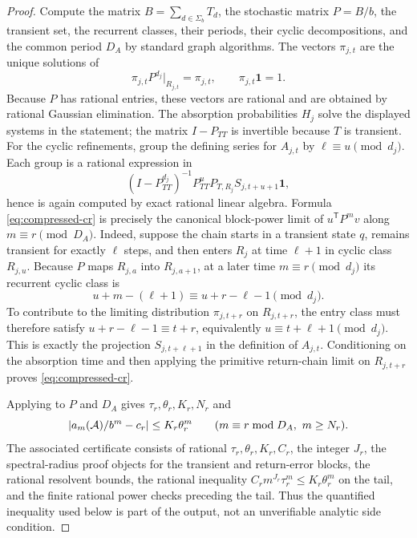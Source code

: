 \begin{proof}
  Compute the matrix \(B=\sum_{d\in\Sigma_b}T_d\), the stochastic matrix
  \(P=B/b\), the transient set, the recurrent classes, their periods,
  their cyclic decompositions, and the common period \(D_A\) by standard
  graph algorithms. The vectors \(\pi_{j,t}\) are the unique solutions
  of
  \[
    \pi_{j,t}P^{d_j}|_{R_{j,t}}=\pi_{j,t},
    \qquad
    \pi_{j,t}\mathbf 1=1.
  \]
  Because \(P\) has rational entries, these vectors are rational and
  are obtained by rational Gaussian elimination. The absorption
  probabilities \(H_j\) solve the displayed systems in the statement;
  the matrix \(I-P_{TT}\) is invertible because \(T\) is transient.
  For the cyclic refinements, group the defining series for
  \(A_{j,t}\) by \(\ell\equiv u\pmod{d_j}\). Each group is a
  rational expression in
  \[
    (I-P_{TT}^{d_j})^{-1}P_{TT}^uP_{T,R_j}S_{j,t+u+1}\mathbf 1,
  \]
  hence is again computed by exact rational linear algebra. Formula
  \eqref{eq:compressed-cr} is precisely the canonical block-power limit
  of \(u^{\mathsf T}P^m v\) along \(m\equiv r\pmod {D_A}\). Indeed,
  suppose the chain starts in a transient state \(q\), remains
  transient for exactly \(\ell\) steps, and then enters \(R_j\) at time
  \(\ell+1\) in cyclic class \(R_{j,u}\). Because \(P\) maps
  \(R_{j,a}\) into \(R_{j,a+1}\), at a later time
  \(m\equiv r\pmod {d_j}\) its recurrent cyclic class is
  \[
    u+m-(\ell+1)\equiv u+r-\ell-1 \pmod {d_j}.
  \]
  To contribute to the limiting distribution
  \(\pi_{j,t+r}\) on \(R_{j,t+r}\), the entry class must therefore
  satisfy \(u+r-\ell-1\equiv t+r\), equivalently
  \(u\equiv t+\ell+1\pmod {d_j}\). This is exactly the projection
  \(S_{j,t+\ell+1}\) in the definition of \(A_{j,t}\). Conditioning on
  the absorption time and then applying the primitive return-chain limit
  on \(R_{j,t+r}\) proves \eqref{eq:compressed-cr}.

  Applying  to \(P\) and
  \(D_A\) gives \(\tau_r,\theta_r,K_r,N_r\) and
  \[
    \lvert a_m(\mathcal A)/b^m-c_r \rvert\le K_r\theta_r^m
    \qquad(m\equiv r\bmod {D_A},\ m\ge N_r).
  \]
  The associated certificate consists of rational
  \(\tau_r,\theta_r,K_r,C_r\), the integer \(J_r\), the
  spectral-radius proof objects for the transient and return-error
  blocks, the rational resolvent bounds, the rational inequality
  \(C_rm^{J_r}\tau_r^m\le K_r\theta_r^m\) on the tail, and the finite
  rational power checks preceding the tail. Thus the quantified
  inequality used below is part of the output, not an unverifiable
  analytic side condition.


\end{proof}

